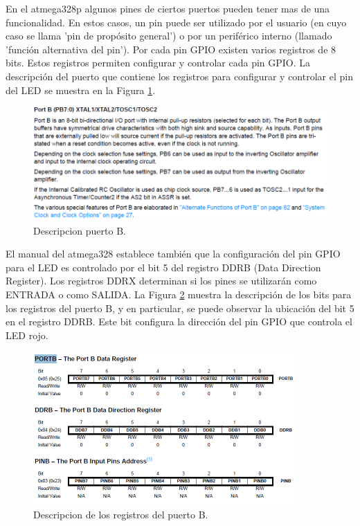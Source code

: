 \documentclass[output=paper, 
colorlinks,
citecolor=brown,
newtxmath
]{langscibook}
\begin{document}
En el atmega328p algunos pines de ciertos puertos pueden tener mas de 
una funcionalidad. En estos casos, un pin puede ser utilizado por el usuario
(en cuyo caso se llama 'pin de propósito general') o por un periférico interno (llamado 'función alternativa del pin').
Por cada pin GPIO 
existen varios registros de 8 bits. 
Estos registros permiten configurar y controlar cada pin GPIO.
La descripción del puerto que contiene los registros
para configurar y controlar el pin del LED se muestra en la Figura \ref{fig:puertob}. 



\begin{figure}
\includegraphics[width=\linewidth]{images/descripcion-registro.png}
\caption{Descripcion puerto B.}
\label{fig:puertob}
\end{figure}



El manual del atmega328 establece también que la configuración del pin GPIO para el
LED es controlado por el bit 5 del registro DDRB (Data Direction Register).
Los registros DDRX determinan si los pines se utilizarán como ENTRADA
o como SALIDA.
La Figura \ref{fig:regpuertob} muestra la descripción de los bits 
para los registros del puerto B, y en particular, se puede observar la ubicación del bit 5 en el registro DDRB. Este
bit configura la dirección del pin GPIO que controla el LED rojo.

\begin{figure}
\includegraphics[width=\linewidth]{images/portb-ddrb.png}
\caption{Descripcion de los registros del puerto B.}
\label{fig:regpuertob}
\end{figure}
\end{document}
